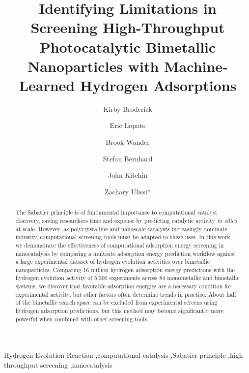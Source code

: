 \documentclass[preprint,12pt]{elsarticle}
\begin{document}
\begin{frontmatter}

\title{Identifying Limitations in Screening High-Throughput Photocatalytic Bimetallic Nanoparticles with Machine-Learned Hydrogen Adsorptions}

\author[add1]{Kirby Broderick}
\author[add2]{Eric Lopato}
\author[add1]{Brook Wander}

\author[add2]{Stefan Bernhard}
\author[add1]{John Kitchin}
\author[add1]{Zachary Ulissi*}
\address[add1]{Carnegie Mellon University Department of Chemical Engineering, 5000 Forbes Avenue, Pittsburgh PA 15213, USA}
\address[add2]{Carnegie Mellon University Department of Chemistry, 4400 Fifth Avenue, Pittsburgh PA 15213, USA}

\raggedright
\begin{abstract}
  The Sabatier principle is of fundamental importance to computational catalyst discovery, saving researchers time and expense by predicting catalytic activity \emph{in silico} at scale. However, as polycrystalline and nanoscale catalysts increasingly dominate industry, computational screening tools must be adapted to these uses. In this work, we demonstrate the effectiveness of computational adsorption energy screening in nanocatalysis by comparing a multisite adsorption energy prediction workflow against a large experimental dataset of hydrogen evolution activities over bimetallic nanoparticles. Comparing 16 million hydrogen adsorption energy predictions with the hydrogen evolution activity of 5,300 experiments across 84 monometallic and bimetallic systems, we discover that favorable adsorption energies are a necessary condition for experimental activity, but other factors often determine trends in practice. About half of the bimetallic search space can be excluded from experimental screens using hydrogen adsorption predictions, but this method may become significantly more powerful when combined with other screening tools.
\end{abstract}

\begin{keyword}
Hydrogen Evolution Reaction \sep computational catalysis \sep Sabatier principle \sep high-throughput screening \sep nanocatalysis
\end{keyword}

\end{frontmatter}

\end{document}
